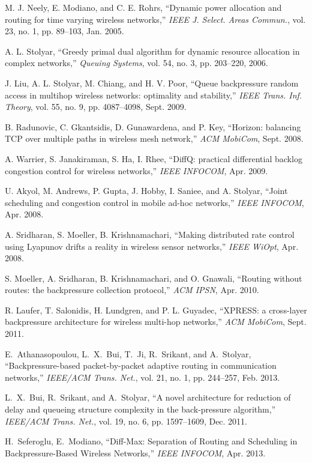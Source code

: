 \documentclass[conference]{IEEEtran}
\begin{document}
\begin{thebibliography}{}
 M. J. Neely, E. Modiano, and C. E. Rohrs, ``Dynamic power allocation and routing for time varying wireless networks,'' {\em IEEE J. Select. Areas Commun.}, vol. 23, no. 1, pp. 89--103, Jan. 2005.

 A. L. Stolyar, ``Greedy primal dual algorithm for dynamic resource allocation in complex networks,'' {\em Queuing Systems}, vol. 54, no. 3, pp. 203--220, 2006.

 J. Liu, A. L. Stolyar, M. Chiang, and H. V. Poor, ``Queue backpressure random access in multihop wireless networks: optimality and stability,'' {\em IEEE Trans. Inf. Theory}, vol. 55, no. 9, pp. 4087--4098, Sept. 2009.

 B. Radunovic, C. Gkantsidis, D. Gunawardena, and P. Key, ``Horizon: balancing TCP over multiple paths in wireless mesh network,'' {\em ACM MobiCom}, Sept. 2008.

 A. Warrier, S. Janakiraman, S. Ha, I. Rhee, ``DiffQ: practical differential backlog congestion control for wireless networks,'' {\em IEEE INFOCOM}, Apr. 2009.

 U. Akyol, M. Andrews, P. Gupta, J. Hobby, I. Saniee, and A. Stolyar, ``Joint scheduling and congestion control in mobile ad-hoc networks,'' {\em IEEE INFOCOM}, Apr. 2008.

 A. Sridharan, S. Moeller, B. Krishnamachari, ``Making distributed rate control using Lyapunov drifts a reality in wireless sensor networks,'' {\em IEEE WiOpt}, Apr. 2008.

 S. Moeller, A. Sridharan, B. Krishnamachari, and O. Gnawali, ``Routing without routes: the backpressure collection protocol,'' {\em ACM IPSN}, Apr. 2010.

 R. Laufer, T. Salonidis, H. Lundgren, and P. L. Guyadec, ``XPRESS: a cross-layer backpressure architecture for wireless multi-hop networks,'' {\em ACM MobiCom}, Sept. 2011.
    
 E.~Athanasopoulou, L.~X.~Bui, T.~Ji, R.~Srikant, and A.~Stolyar, ``Backpressure-based packet-by-packet adaptive routing in communication networks,'' {\em IEEE/ACM Trans. Net.}, vol. 21, no. 1, pp. 244--257, Feb. 2013.

 L.~X.~Bui, R.~Srikant, and A.~Stolyar, ``A novel architecture for reduction of delay and queueing structure complexity in the back-pressure algorithm,'' {\em IEEE/ACM Trans. Net.}, vol. 19, no. 6, pp. 1597--1609, Dec. 2011.

 H.~Seferoglu, E.~Modiano, ``Diff-Max: Separation of Routing and Scheduling in Backpressure-Based Wireless Networks,'' {\em IEEE INFOCOM}, Apr. 2013.

\end{thebibliography}
\end{document}
